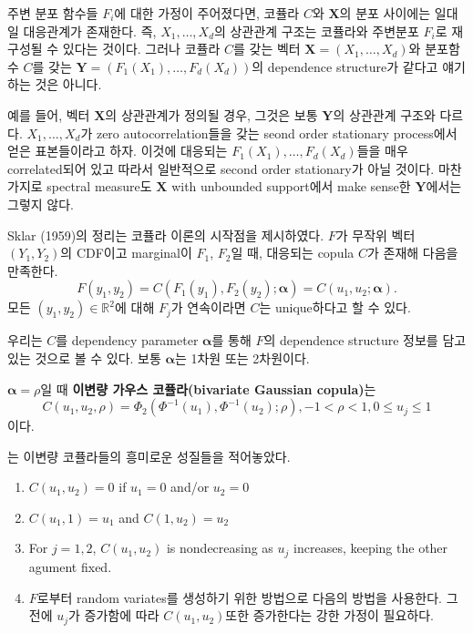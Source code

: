 \documentclass[b5paper,]{scrbook}
\theoremstyle{plain}
\theoremstyle{definition}
\numberwithin{equation}{section}
\let\BeginKnitrBlock\begin \let\EndKnitrBlock\end
\begin{document}
주변 분포 함수들 \(F_{i}\)에 대한 가정이 주어졌다면, 코퓰라 \(C\)와 \(\mathbf{X}\)의 분포 사이에는 일대일 대응관계가 존재한다. 즉, \(X_{1},\ldots, X_{d}\)의 상관관계 구조는 코퓰라와 주변분포 \(F_{i}\)로 재구성될 수 있다는 것이다. 그러나 코퓰라 \(C\)를 갖는 벡터 \(\mathbf{X}=(X_{1},\ldots, X_{d})\)와 분포함수 \(C\)를 갖는 \(\mathbf{Y}=(F_{1}(X_{1}), \ldots, F_{d}(X_{d}))\)의 dependence structure가 같다고 얘기하는 것은 아니다.

예를 들어, 벡터 \(\mathbf{X}\)의 상관관계가 정의될 경우, 그것은 보통 \(\mathbf{Y}\)의 상관관계 구조와 다르다. \(X_{1},\ldots, X_{d}\)가 zero autocorrelation들을 갖는 seond order stationary process에서 얻은 표본들이라고 하자. 이것에 대응되는 \(F_{1}(X_{1}), \ldots, F_{d}(X_{d})\)들을 매우 correlated되어 있고 따라서 일반적으로 second order stationary가 아닐 것이다. 마찬가지로 spectral measure도 \(\mathbf{X}\) with unbounded support에서 make sense한 \(\mathbf{Y}\)에서는 그렇지 않다.

\BeginKnitrBlock{theorem}[누적 분포 함수와 코퓰라]
\protect\hypertarget{thm:unnamed-chunk-456}{}{\label{thm:unnamed-chunk-456} {} }Sklar (1959)의 정리는 코퓰라 이론의 시작점을 제시하였다. \citep{Yee2015} \(F\)가 무작위 벡터 \((Y_{1}, Y_{2})\)의 CDF이고 marginal이 \(F_{1}\), \(F_{2}\)일 때, 대응되는 copula \(C\)가 존재해 다음을 만족한다.
\[F(y_{1}, y_{2})=C(F_{1}(y_{1}), F_{2}(y_{2});\boldsymbol{\alpha})=C(u_{1},u_{2};\boldsymbol{\alpha}).\]
모든 \((y_{1}, y_{2})\in\mathbb{R}^{2}\)에 대해 \(F_{j}\)가 연속이라면 \(C\)는 unique하다고 할 수 있다.
\EndKnitrBlock{theorem}

우리는 \(C\)를 dependency parameter \(\boldsymbol{\alpha}\)를 통해 \(F\)의 dependence structure 정보를 담고 있는 것으로 볼 수 있다. 보통 \(\boldsymbol{\alpha}\)는 1차원 또는 2차원이다.

\BeginKnitrBlock{example}[이변량 가우스 코퓰라]
\protect\hypertarget{exm:unnamed-chunk-457}{}{\label{exm:unnamed-chunk-457} {} }\(\boldsymbol{\alpha}=\rho\)일 때 \textbf{이변량 가우스 코퓰라(bivariate Gaussian copula)}는
\[C(u_{1}, u_{2}, \rho)=\Phi_{2}(\Phi^{-1}(u_{1}), \Phi^{-1}(u_{2});\rho), -1<\rho < 1, 0\leq u_{j} \leq 1\]
이다.
\EndKnitrBlock{example}

\citep{Yee2015}는 이변량 코퓰라들의 흥미로운 성질들을 적어놓았다.

\begin{enumerate}
\def\labelenumi{\arabic{enumi}.}
\item
  \(C(u_{1}, u_{2})=0\) if \(u_{1}=0\) and/or \(u_{2}=0\)
\item
  \(C(u_{1}, 1) =u_{1}\) and \(C(1,u_{2})=u_{2}\)
\item
  For \(j=1,2\), \(C(u_{1}, u_{2})\) is nondecreasing as \(u_{j}\) increases, keeping the other agument fixed.
\item
  \(F\)로부터 random variates를 생성하기 위한 방법으로 다음의 방법을 사용한다. 그 전에 \(u_{j}\)가 증가함에 따라 \(C(u_{1}, u_{2})\)또한 증가한다는 강한 가정이 필요하다.
\end{enumerate}
\end{document}
